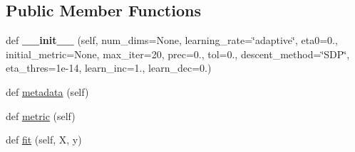\subsection*{Public Member Functions}
\begin{DoxyCompactItemize}
\item 
def {\bfseries \+\_\+\+\_\+init\+\_\+\+\_\+} (self, num\+\_\+dims=None, learning\+\_\+rate=\char`\"{}adaptive\char`\"{}, eta0=0., initial\+\_\+metric=None, max\+\_\+iter=20, prec=0., tol=0., descent\+\_\+method=\char`\"{}S\+DP\char`\"{}, eta\+\_\+thres=1e-\/14, learn\+\_\+inc=1., learn\+\_\+dec=0.)\hypertarget{classdml_1_1mcml_1_1MCML_ab24bfae43298806c065030a453dd6613}{}\label{classdml_1_1mcml_1_1MCML_ab24bfae43298806c065030a453dd6613}

\item 
def \hyperlink{classdml_1_1mcml_1_1MCML_a73bb7173d9688126b49e585ff4434892}{metadata} (self)
\item 
def \hyperlink{classdml_1_1mcml_1_1MCML_ad1980c9bf7c3b8843d36f8f1666e08a6}{metric} (self)
\item 
def \hyperlink{classdml_1_1mcml_1_1MCML_a0984330dd64aad712a46dcc3ba27baa8}{fit} (self, X, y)
\end{DoxyCompactItemize}
